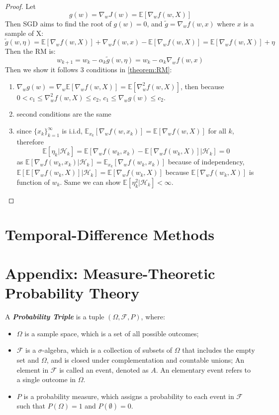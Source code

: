 \documentclass[10pt]{elegantbook}
\newcommand{\mydefination}[1]{\textbf{\textit{\textcolor{structurecolor}{#1}}}}
\begin{document}
\begin{proof}
    Let 
    \[ g(w) = \nabla_w J(w) = \mathbb E[ \nabla_w f(w, X) ] \]
    Then SGD aims to find the root of $g(w) = 0$, and $\tilde{g} = \nabla_w f(w, x)$ where $x$ is a sample of X:
    \[ \tilde{g}(w, \eta) = \mathbb E[ \nabla_w f(w, X) ] + \nabla_w f(w, x) - \mathbb E[ \nabla_w f(w, X) ] = \mathbb E[ \nabla_w f(w, X) ] + \eta \]
    Then the RM is:
    \[ w_{k+1} = w_k - \alpha_k \tilde{g}(w, \eta) = w_k - \alpha_k \nabla_w f(w, x) \]
    Then we show it follows 3 conditions in \ref{theorem:RM}:
    \begin{enumerate}
        \item $\nabla_w g(w) = \nabla_w \mathbb E[ \nabla_w f(w, X) ] = \mathbb E[ \nabla^2_w f(w, X) ] $, then because $0 < c_1 \leq \nabla_w^2 f(w, X) \leq c_2$,
    $c_1 \leq \nabla_w g(w) \leq c_2$.
        \item second conditions are the same
        \item since $\{ x_k \}_{k=1}^{\infty}$ is i.i.d, $ \mathbb E_{x_k}[ \nabla_w f(w, x_k) ] = \mathbb E[ \nabla_w f(w, X) ]$ for all $k$, therefore
        \[ \mathbb{E}[\eta_k|\mathcal{H}_k] = \mathbb{E}[\nabla_wf(w_k,x_k)-\mathbb{E}[\nabla_wf(w_k,X)]|\mathcal{H}_k] = 0 \]
        as $\mathbb{E}[\nabla_wf(w_k,x_k) | \mathcal{H}_k] = \mathbb E_{x_k}[ \nabla_w f(w_k, x_k)]$ because of independency, 
        $\mathbb{E}[\mathbb{E}[\nabla_wf(w_k,X)]|\mathcal{H}_k] = \mathbb{E}[\nabla_wf(w_k,X)]$ because $\mathbb{E}[\nabla_wf(w_k,X)]$ is function of $w_k$.
        Same we can show $\mathbb{E}[\eta^2_k|\mathcal{H}_k] < \infty$.
    \end{enumerate}
\end{proof}


\section{Temporal-Difference Methods}





\section{Appendix: Measure-Theoretic Probability Theory}
A \mydefination{Probability Triple} is a tuple $(\Omega, \mathcal F, P)$, where:
\begin{itemize}
    \item $\Omega$ is a sample space, which is a set of all possible outcomes;
    \item $\mathcal F$ is a $\sigma$-algebra, which is a collection of subsets of $\Omega$ that includes the empty set and $\Omega$, and is closed under complementation and countable unions;
    An element in $\mathcal F$ is called an event, denoted as $A$. An elementary event refers to a single outcome in $\Omega$.
    \item $P$ is a probability measure, which assigns a probability to each event in $\mathcal F$ such that $P(\Omega) = 1$ and $P(\emptyset) = 0$.
\end{itemize}
\end{document}
